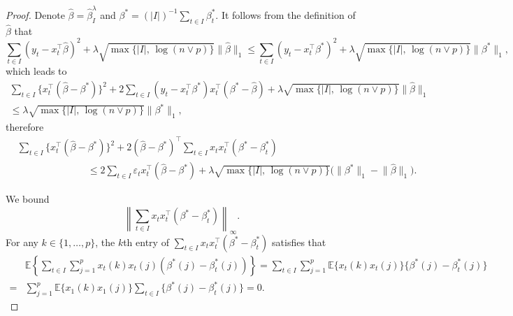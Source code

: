 \documentclass[twoside]{article}
\begin{document}
\begin{proof} 
Denote $\widehat{\beta} = \widehat\beta_{I}^\lambda$ and $\beta^* = (|I|)^{-1}\sum_{t \in I} \beta^*_t$.  It follows from the definition of $\widehat{\beta}$ that 
	\[
		\sum_{t \in I} (y_t - x_t^{\top}\widehat{\beta})^2 + \lambda \sqrt{\max\{|I|, \, \log(n \vee p)\}} \bigl\|\widehat{\beta}\bigr\|_1 \leq \sum_{t \in I} (y_t - x_t^{\top}\beta^*)^2 + \lambda \sqrt{\max\{|I|, \, \log(n \vee p)\}} \bigl\|\beta^*\bigr\|_1,
	\]
	which leads to
	\begin{align*}
		\sum_{t \in I} \bigl\{x_t^{\top}(\widehat{\beta} - \beta^*)\bigr\}^2 +  2\sum_{t \in I}(y_t - x_t^{\top}\beta^*)x_t^{\top}(\beta^* - \widehat{\beta})  + \lambda \sqrt{\max\{|I|, \, \log(n \vee p)\}} \bigl\|\widehat{\beta}\bigr\|_1 \\
		\leq \lambda \sqrt{\max\{|I|, \, \log(n \vee p)\}} \bigl\|\beta^*\bigr\|_1,
	\end{align*}
	therefore
	\begin{align}
		& \sum_{t \in I} \bigl\{x_t^{\top}(\widehat{\beta} - \beta^*)\bigr\}^2 + 2(\widehat{\beta} - \beta^*)^{\top}\sum_{t \in I} x_t x_t^{\top}(\beta^* - \beta^*_t) \nonumber \\
		& \hspace{3cm} \leq 2\sum_{t \in I} \varepsilon_t x_t^{\top}(\widehat{\beta} - \beta^*) + \lambda \sqrt{\max\{|I|, \, \log(n \vee p)\}}\bigl(\bigl\|\beta^*\bigr\|_1 - \bigl\|\widehat{\beta}\bigr\|_1\bigr).	 \label{eq-lem10-pf-2}
	\end{align}
	
We bound	
	\[
		\left\|\sum_{t \in I} x_t x_t^\top (\beta^*  -\beta^*_t) \right\|_{\infty}.  
	\]
	For any $k \in \{1, \ldots, p\}$, the $k$th entry of $\sum_{t \in I} x_t x_t^\top (\beta^*  -\beta^*_t)$ satisfies that
	\begin{align*}
		& \mathbb{E}\left\{\sum_{t \in I} \sum_{j = 1}^p x_t(k)x_t(j)(\beta^*(j) - \beta^*_t(j))\right\} = \sum_{t \in I}\sum_{j = 1}^p \mathbb{E}\{x_t(k) x_t(j)\}\{\beta^*(j) - \beta^*_t(j)\} \\
		= & \sum_{j = 1}^p \mathbb{E}\{x_1(k) x_1(j)\} \sum_{t \in I}\{\beta^*(j) - \beta^*_t(j)\} = 0.
	\end{align*}


\end{proof}
\end{document}
